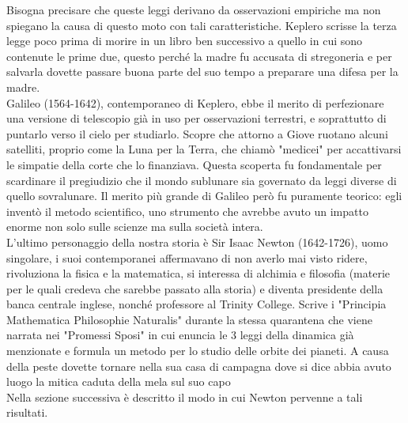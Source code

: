 \documentclass[10pt,a4paper]{article}
\begin{document}
Bisogna precisare che queste leggi derivano da osservazioni empiriche ma non spiegano la causa di questo moto con tali caratteristiche. Keplero scrisse la terza legge poco prima di morire in un libro ben successivo a quello in cui sono contenute le prime due, questo perché la madre fu accusata di stregoneria e per salvarla dovette passare buona parte del suo tempo a preparare una difesa per la madre.\\
Galileo (1564-1642), contemporaneo di Keplero, ebbe il merito di  perfezionare una versione di telescopio già in uso per osservazioni terrestri, e soprattutto di puntarlo verso il cielo per studiarlo. Scopre che attorno a Giove ruotano alcuni satelliti, proprio come la Luna per la Terra, che chiamò "medicei" per accattivarsi le simpatie della corte che lo finanziava. Questa scoperta fu fondamentale per scardinare il pregiudizio che il mondo sublunare sia governato da leggi diverse di quello sovralunare. Il merito più grande di Galileo però fu puramente teorico: egli inventò il metodo scientifico, uno strumento che avrebbe avuto un impatto enorme non solo sulle scienze ma sulla società intera.\\
L'ultimo personaggio della nostra storia è Sir Isaac Newton (1642-1726), uomo singolare, i suoi contemporanei affermavano di non averlo mai visto ridere, rivoluziona la fisica e la matematica, si interessa di alchimia e filosofia (materie per le quali credeva che sarebbe passato alla storia) e diventa presidente della banca centrale inglese, nonché professore al Trinity College.
Scrive i "Principia Mathematica Philosophie Naturalis" durante la stessa quarantena che viene narrata nei "Promessi Sposi" in cui enuncia le 3 leggi della dinamica già menzionate e formula un metodo per lo studio delle orbite dei pianeti. A causa della peste dovette tornare nella sua casa di campagna dove si dice abbia avuto luogo la mitica caduta della mela sul suo capo\\
Nella sezione successiva è descritto il modo in cui Newton pervenne a tali risultati.
\end{document}

